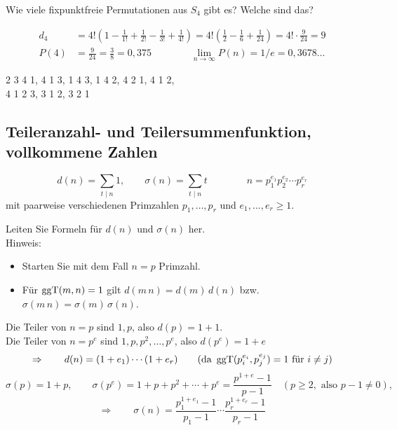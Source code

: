 \begin{aufgabe}[Aufgabe 2]
Wie viele fixpunktfreie Permutationen aus $S_4$ gibt es? Welche sind das?
\end{aufgabe}

\begin{loesung}
\begin{align*}
d_4 &= 4!\left(1 - \frac{1}{1!} + \frac{1}{2!} - \frac{1}{3!} + \frac{1}{4!}\right) = 4!\left(\frac{1}{2} - \frac{1}{6} + \frac{1}{24}\right) = 4! \cdot \frac{9}{24} = 9\\
P(4) &= \frac{9}{24} = \frac{3}{8} = 0{,}375 \qquad\qquad \lim_{n \to \infty} P(n) = 1/e = 0{,}3678\ldots
\end{align*}

2 3 4 1,  4 1 3,  1 4 3,  1 4 2,  4 2 1,  4 1 2,\\
4 1 2 3,  3 1 2,  3 2 1
\end{loesung}

\subsection{Teileranzahl- und Teilersummenfunktion, vollkommene Zahlen}

\[
d(n) = \sum_{t \mid n} 1, \qquad \sigma(n) = \sum_{t \mid n} t \qquad\qquad n = p_1^{e_1} p_2^{e_2} \cdots p_r^{e_r}
\]
mit paarweise verschiedenen Primzahlen $p_1, \ldots, p_r$ und $e_1, \ldots, e_r \geq 1$.

\begin{aufgabe}[Aufgabe 3]
Leiten Sie Formeln für $d(n)$ und $\sigma(n)$ her.\\
Hinweis:
\begin{itemize}
  \item[-] Starten Sie mit dem Fall $n = p$ Primzahl.
  \item[-] Für $\operatorname{ggT}(m, n) = 1$ gilt $d(m\,n) = d(m)\,d(n)$ bzw.\ $\sigma(m\,n) = \sigma(m)\,\sigma(n)$.
\end{itemize}
\end{aufgabe}

\begin{loesung}
Die Teiler von $n = p$ sind $1, p$, also $d(p) = 1 + 1$.\\
Die Teiler von $n = p^e$ sind $1, p, p^2, \ldots, p^e$, also $d(p^e) = 1 + e$
\[
\Rightarrow\qquad d(n) = (1 + e_1) \cdots (1 + e_r) \qquad (\text{da } \operatorname{ggT}(p_i^{e_i}, p_j^{e_j}) = 1 \text{ für } i \neq j)
\]
\[
\sigma(p) = 1 + p, \qquad \sigma(p^e) = 1 + p + p^2 + \cdots + p^e = \frac{p^{1+e} - 1}{p - 1} \quad (p \geq 2, \text{ also } p - 1 \neq 0),
\]
\[
\Rightarrow\qquad \sigma(n) = \frac{p_1^{1+e_1} - 1}{p_1 - 1} \cdots \frac{p_r^{1+e_r} - 1}{p_r - 1}
\]
\end{loesung}

